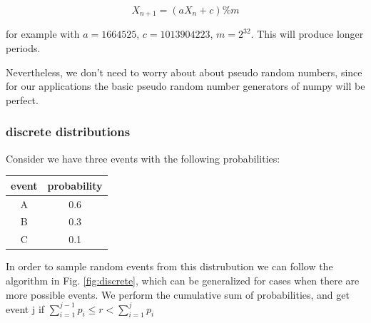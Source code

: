 \[
X_{n+1}=(aX_n+c)\%m
\]

\noindent for example with $a=1664525$, $c=1013904223$, $m=2^{32}$. This will produce longer periods.

Nevertheless, we don't need to worry about about pseudo random numbers, since for our applications the basic pseudo random number generators of numpy will be perfect.

\subsubsection{discrete distributions}

Consider we have three events with the following probabilities:


\begin{table}
\centering\begin{tabular}{c | c}
event & probability \\
\hline
A & 0.6 \\
B & 0.3 \\
C & 0.1 
\end{tabular}
\end{table}


In order to sample random events from this distrubution we can follow the algorithm in Fig. \ref{fig:discrete}, which can be generalized for cases when there are more possible events. We perform the cumulative sum of probabilities, and get event j if $\sum_{i=1}^{j-1}p_i\leq r <\sum_{i=1}^{j}p_i$


